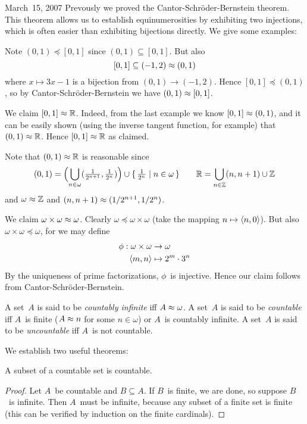 \begin{lecture}{March~15, 2007}
Prevously we proved the Cantor-Schr\"oder-Bernstein theorem. This theorem allows us to establish equinumerosities by exhibiting two injections, which is often easier than exhibiting bijections directly. We give some examples:
\begin{example}
Note \((0,1)\preceq [0,1]\) since \((0,1)\subseteq [0,1]\). But also
\[[0,1]\subseteq (-1,2)\approx(0,1)\]
where \(x\mapsto 3x-1\) is a bijection from \((0,1)\to (-1,2)\). Hence \([0,1]\preceq (0,1)\), so by Cantor-Schr\"oder-Bernstein we have \((0,1)\approx[0,1]\).
\end{example}
\begin{example}
We claim \([0,1]\approx\mathbb{R}\). Indeed, from the last example we know \([0,1]\approx(0,1)\), and it can be easily shown (using the inverse tangent function, for example) that \((0,1)\approx\mathbb{R}\). Hence \([0,1]\approx\mathbb{R}\) as claimed.

Note that \((0,1)\approx\mathbb{R}\) is reasonable since
\[(0,1)=\Bigl(\bigcup_{n\in\omega}(\tfrac{1}{2^{n+1}},\tfrac{1}{2^n})\Bigr)\cup\{\,\tfrac{1}{2^n}\mid n\in\omega\,\}\qquad\mathbb{R}=\bigcup_{n\in\mathbb{Z}}(n,n+1)\cup\mathbb{Z}\]
and \(\omega\approx\mathbb{Z}\) and \((n,n+1)\approx(1/2^{n+1},1/2^n)\).
\end{example}
\begin{example}
We claim \(\omega\times\omega\approx\omega\). Clearly \(\omega\preceq\omega\times\omega\) (take the mapping \(n\mapsto\langle{n},{0}\rangle\)). But also \(\omega\times\omega\preceq\omega\), for we may define
\begin{align*}
\phi:\omega\times\omega&\to\omega\\
		\langle{m},{n}\rangle&\mapsto 2^m\cdot 3^n
\end{align*}
By the uniqueness of prime factorizations, \(\phi\)~is injective. Hence our claim follows from Cantor-Schr\"oder-Bernstein.
\end{example}
\begin{defn}
A set~\(A\) is said to be \emph{countably infinite} iff \(A\approx\omega\). A set~\(A\) is said to be \emph{countable} iff \(A\)~is finite (\(A\approx n\) for some \(n\in\omega\)) or \(A\)~is countably infinite. A set~\(A\) is said to be \emph{uncountable} iff \(A\)~is not countable.
\end{defn}
\noindent We establish two useful theorems:
\begin{thm}
A subset of a countable set is countable.
\end{thm}
\begin{proof}
Let \(A\)~be countable and \(B\subseteq A\). If \(B\)~is finite, we are done, so suppose \(B\)~is infinite. Then \(A\)~must be infinite, because any subset of a finite set is finite (this can be verified by induction on the finite cardinals).


\end{proof}
\end{lecture}
